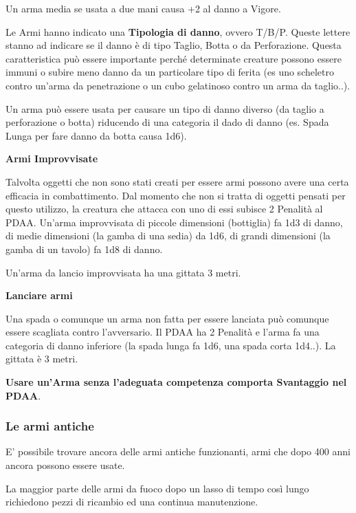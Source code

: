 \documentclass[12pt,a4paper,twoside,openany]{book}
\begin{document}
\begin{multicols}{2}
\medskip

Un arma media se usata a due mani causa +2 al danno a Vigore.


Le Armi hanno indicato una \textbf{Tipologia di danno}, ovvero T/B/P.
Queste lettere stanno ad indicare se il danno è di tipo Taglio, Botta o da Perforazione. Questa caratteristica può essere importante perché determinate creature possono essere immuni o subire meno danno da un particolare tipo di ferita (es uno scheletro contro un'arma da penetrazione o un cubo gelatinoso contro un arma da taglio..).

Un arma può essere usata per causare un tipo di danno diverso (da taglio a perforazione o botta) riducendo di una categoria il dado di danno (es. Spada Lunga per fare danno da botta causa 1d6).

\medskip

\textbf{Armi Improvvisate}

Talvolta oggetti che non sono stati creati per essere armi possono avere una certa efficacia in combattimento. Dal momento che non si tratta di oggetti pensati per questo utilizzo, la creatura che attacca con uno di essi subisce 2 Penalità al PDAA. Un'arma improvvisata di piccole dimensioni (bottiglia) fa 1d3 di danno, di medie dimensioni (la gamba di una sedia) da 1d6, di grandi dimensioni (la gamba di un tavolo) fa 1d8 di danno.

Un'arma da lancio improvvisata ha una gittata 3 metri.

\medskip

\textbf{Lanciare armi}

Una spada o comunque un arma non fatta per essere lanciata può comunque essere scagliata contro l'avversario. Il PDAA ha 2 Penalità e l'arma fa una categoria di danno inferiore (la spada lunga fa 1d6, una spada corta 1d4..). La gittata è 3 metri.

\medskip

\textbf{Usare un'Arma senza l'adeguata competenza comporta Svantaggio nel PDAA}.

\subsubsection{Le armi antiche}

E' possibile trovare ancora delle armi antiche funzionanti, armi che dopo 400 anni ancora possono essere usate.

La maggior parte delle armi da fuoco dopo un lasso di tempo così lungo richiedono pezzi di ricambio ed una continua manutenzione.


\end{multicols}
\end{document}
